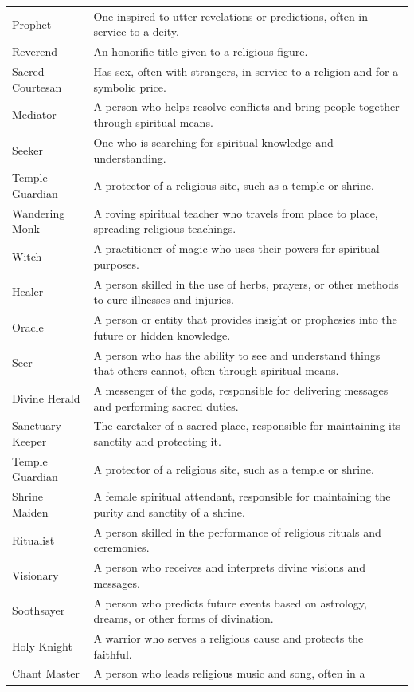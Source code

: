 \begin{longtable}[]{@{}
  >{\raggedright\arraybackslash}p{}
  >{\raggedright\arraybackslash}p{}@{}}
Prophet & One inspired to utter revelations or predictions, often in
service to a deity. \\
Reverend & An honorific title given to a religious figure. \\
Sacred Courtesan & Has sex, often with strangers, in service to a
religion and for a symbolic price. \\
Mediator & A person who helps resolve conflicts and bring people
together through spiritual means. \\
Seeker & One who is searching for spiritual knowledge and
understanding. \\
Temple Guardian & A protector of a religious site, such as a temple or
shrine. \\
Wandering Monk & A roving spiritual teacher who travels from place to
place, spreading religious teachings. \\
Witch & A practitioner of magic who uses their powers for spiritual
purposes. \\
Healer & A person skilled in the use of herbs, prayers, or other methods
to cure illnesses and injuries. \\
Oracle & A person or entity that provides insight or prophesies into the
future or hidden knowledge. \\
Seer & A person who has the ability to see and understand things that
others cannot, often through spiritual means. \\
Divine Herald & A messenger of the gods, responsible for delivering
messages and performing sacred duties. \\
Sanctuary Keeper & The caretaker of a sacred place, responsible for
maintaining its sanctity and protecting it. \\
Temple Guardian & A protector of a religious site, such as a temple or
shrine. \\
Shrine Maiden & A female spiritual attendant, responsible for
maintaining the purity and sanctity of a shrine. \\
Ritualist & A person skilled in the performance of religious rituals and
ceremonies. \\
Visionary & A person who receives and interprets divine visions and
messages. \\
Soothsayer & A person who predicts future events based on astrology,
dreams, or other forms of divination. \\
Holy Knight & A warrior who serves a religious cause and protects the
faithful. \\
Chant Master & A person who leads religious music and song, often in a

\end{longtable}
